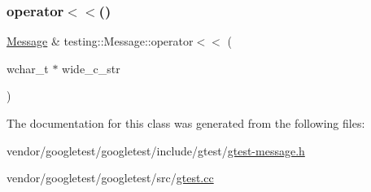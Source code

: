\mbox{\label{classtesting_1_1_message_ac1d3a041ac4bb9c929ee746b31a13d6a}} 
\subsubsection{\texorpdfstring{operator$<$$<$()}{operator<<()}\hspace{0.1cm}{\footnotesize\ttfamily [6/6]}}
{\footnotesize\ttfamily \hyperlink{classtesting_1_1_message}{Message} \& testing\+::\+Message\+::operator$<$$<$ (\begin{DoxyParamCaption}\item[{wchar\+\_\+t $\ast$}]{wide\+\_\+c\+\_\+str }\end{DoxyParamCaption})}



The documentation for this class was generated from the following files\+:\begin{DoxyCompactItemize}
\item 
vendor/googletest/googletest/include/gtest/\hyperlink{gtest-message_8h}{gtest-\/message.\+h}\item 
vendor/googletest/googletest/src/\hyperlink{gtest_8cc}{gtest.\+cc}\end{DoxyCompactItemize}
